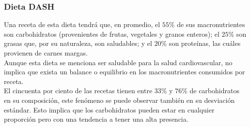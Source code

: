 \documentclass[12pt,a4paper]{article}
\begin{document}
    \subsubsection{Dieta DASH}
        Una receta de esta dieta tendrá que, en promedio, el $55\%$ de sus 
        macronutrientes son carbohidratos (provenientes de frutas, vegetales 
        y granos enteros); el $25\%$ son grasas que, por su naturaleza, son 
        saludables; y el $20\%$ son proteínas, las cuáles provienen de carnes margas.\\
        Aunque esta dieta se menciona ser saludable para la salud cardiovascular, 
        no implica que exista un balance o equilibrio en los macronutrientes 
        consumidos por receta.\\

        El cincuenta por ciento de las recetas tienen entre $33\%$ y $76\%$ 
        de carbohidratos en su composición, este fenómeno se puede observar 
        también	en su desviación estándar. Esto implica que los carbohidratos 
        pueden estar en cualquier proporción pero con una tendencia a tener 
        una alta presencia.\\
\end{document}
